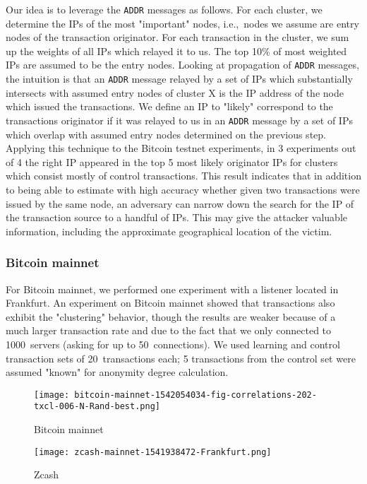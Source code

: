 Our idea is to leverage the \texttt{ADDR} messages as follows.
For each cluster, we determine the IPs of the most "important" nodes, i.e.,~nodes we assume are entry nodes of the transaction originator.
For each transaction in the cluster, we sum up the weights of all IPs which relayed it to us.
The top 10\% of most weighted IPs are assumed to be the entry nodes.
Looking at propagation of \texttt{ADDR} messages, the intuition is that an \texttt{ADDR} message relayed by a set of IPs which substantially intersects with assumed entry nodes of cluster X is the IP address of the node which issued the transactions.
We define an IP to "likely" correspond to the transactions originator if it was relayed to us in an \texttt{ADDR} message by a set of IPs which overlap with assumed entry nodes determined on the previous step.
Applying this technique to the Bitcoin testnet experiments, in 3 experiments out of 4 the right IP appeared in the top 5 most likely originator IPs for clusters which consist mostly of control transactions.
This result indicates that in addition to being able to estimate with high accuracy whether given two transactions were issued by the same node, an adversary can narrow down the search for the IP of the transaction source to a handful of IPs.
This may give the attacker valuable information, including the approximate geographical location of the victim.

\subsubsection{Bitcoin mainnet}

For Bitcoin mainnet, we performed one experiment with a listener located in Frankfurt.
An experiment on Bitcoin mainnet showed that transactions also exhibit the "clustering" behavior, though the results are weaker because of a much larger transaction rate and due to the fact that we only connected to 1000~servers (asking for up to 50~connections).
We used learning and control transaction sets of 20~transactions each; 5 transactions from the control set were assumed "known" for anonymity degree calculation.

\begin{figure*}
	\centering
	\begin{minipage}{0.5\textwidth}
		\centering
		\texttt{[image: bitcoin-mainnet-1542054034-fig-correlations-202-txcl-006-N-Rand-best.png]}
		\caption{Bitcoin mainnet}
	\end{minipage}\hfill
	\begin{minipage}{0.5\textwidth}
		\centering
		\texttt{[image: zcash-mainnet-1541938472-Frankfurt.png]}
		\caption{Zcash}
	\end{minipage}\hfill
	\label{fig:bitcoin-zcash}
\end{figure*}

